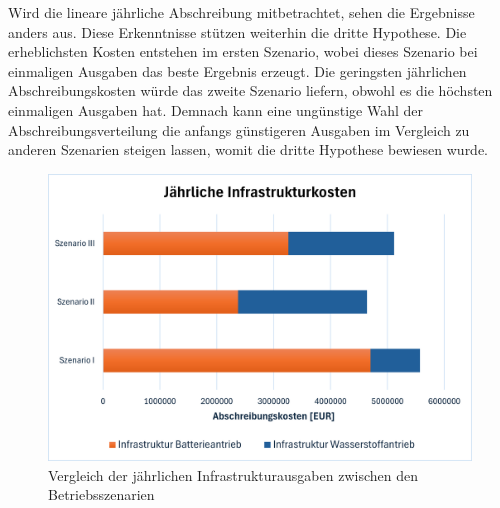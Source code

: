 %
Wird die lineare jährliche Abschreibung mitbetrachtet, sehen die Ergebnisse anders aus. 
Diese Erkenntnisse stützen weiterhin die dritte Hypothese.
Die erheblichsten Kosten entstehen im ersten Szenario, 
wobei dieses Szenario bei einmaligen Ausgaben das beste Ergebnis erzeugt.
Die geringsten jährlichen Abschreibungskosten würde das zweite Szenario liefern, 
obwohl es die höchsten einmaligen Ausgaben hat. 
Demnach kann eine ungünstige Wahl der Abschreibungsverteilung die anfangs günstigeren Ausgaben 
im Vergleich zu anderen Szenarien steigen lassen, womit die dritte Hypothese bewiesen wurde.\\
%
\begin{figure}[h]
	\centering
	\includegraphics[width=0.8\linewidth]{Bilder/infr_abschreibung.png}
	\caption[Vergleich der jährlichen Infrastrukturausgaben zwischen den Betriebsszenarien]{Vergleich der jährlichen Infrastrukturausgaben zwischen den Betriebsszenarien}
	\label{res_betriebsszenarien}
\end{figure}

